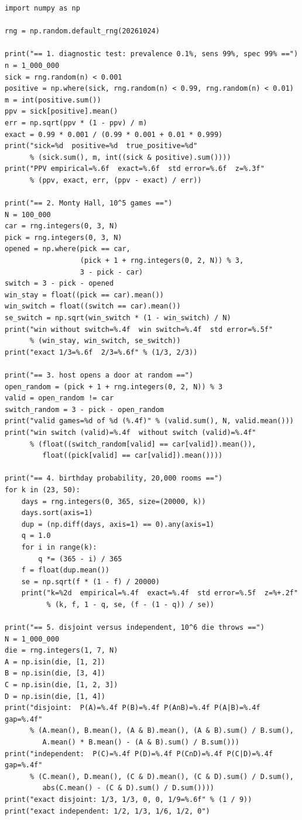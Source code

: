 \begin{lab}
\begin{verbatim}
import numpy as np

rng = np.random.default_rng(20261024)

print("== 1. diagnostic test: prevalence 0.1%, sens 99%, spec 99% ==")
n = 1_000_000
sick = rng.random(n) < 0.001
positive = np.where(sick, rng.random(n) < 0.99, rng.random(n) < 0.01)
m = int(positive.sum())
ppv = sick[positive].mean()
err = np.sqrt(ppv * (1 - ppv) / m)
exact = 0.99 * 0.001 / (0.99 * 0.001 + 0.01 * 0.999)
print("sick=%d  positive=%d  true_positive=%d"
      % (sick.sum(), m, int((sick & positive).sum())))
print("PPV empirical=%.6f  exact=%.6f  std error=%.6f  z=%.3f"
      % (ppv, exact, err, (ppv - exact) / err))

print("== 2. Monty Hall, 10^5 games ==")
N = 100_000
car = rng.integers(0, 3, N)
pick = rng.integers(0, 3, N)
opened = np.where(pick == car,
                  (pick + 1 + rng.integers(0, 2, N)) % 3,
                  3 - pick - car)
switch = 3 - pick - opened
win_stay = float((pick == car).mean())
win_switch = float((switch == car).mean())
se_switch = np.sqrt(win_switch * (1 - win_switch) / N)
print("win without switch=%.4f  win switch=%.4f  std error=%.5f"
      % (win_stay, win_switch, se_switch))
print("exact 1/3=%.6f  2/3=%.6f" % (1/3, 2/3))

print("== 3. host opens a door at random ==")
open_random = (pick + 1 + rng.integers(0, 2, N)) % 3
valid = open_random != car
switch_random = 3 - pick - open_random
print("valid games=%d of %d (%.4f)" % (valid.sum(), N, valid.mean()))
print("win switch (valid)=%.4f  without switch (valid)=%.4f"
      % (float((switch_random[valid] == car[valid]).mean()),
         float((pick[valid] == car[valid]).mean())))

print("== 4. birthday probability, 20,000 rooms ==")
for k in (23, 50):
    days = rng.integers(0, 365, size=(20000, k))
    days.sort(axis=1)
    dup = (np.diff(days, axis=1) == 0).any(axis=1)
    q = 1.0
    for i in range(k):
        q *= (365 - i) / 365
    f = float(dup.mean())
    se = np.sqrt(f * (1 - f) / 20000)
    print("k=%2d  empirical=%.4f  exact=%.4f  std error=%.5f  z=%+.2f"
          % (k, f, 1 - q, se, (f - (1 - q)) / se))

print("== 5. disjoint versus independent, 10^6 die throws ==")
N = 1_000_000
die = rng.integers(1, 7, N)
A = np.isin(die, [1, 2])
B = np.isin(die, [3, 4])
C = np.isin(die, [1, 2, 3])
D = np.isin(die, [1, 4])
print("disjoint:  P(A)=%.4f P(B)=%.4f P(AnB)=%.4f P(A|B)=%.4f gap=%.4f"
      % (A.mean(), B.mean(), (A & B).mean(), (A & B).sum() / B.sum(),
         A.mean() * B.mean() - (A & B).sum() / B.sum()))
print("independent:  P(C)=%.4f P(D)=%.4f P(CnD)=%.4f P(C|D)=%.4f gap=%.4f"
      % (C.mean(), D.mean(), (C & D).mean(), (C & D).sum() / D.sum(),
         abs(C.mean() - (C & D).sum() / D.sum())))
print("exact disjoint: 1/3, 1/3, 0, 0, 1/9=%.6f" % (1 / 9))
print("exact independent: 1/2, 1/3, 1/6, 1/2, 0")
\end{verbatim}    
\end{lab}

